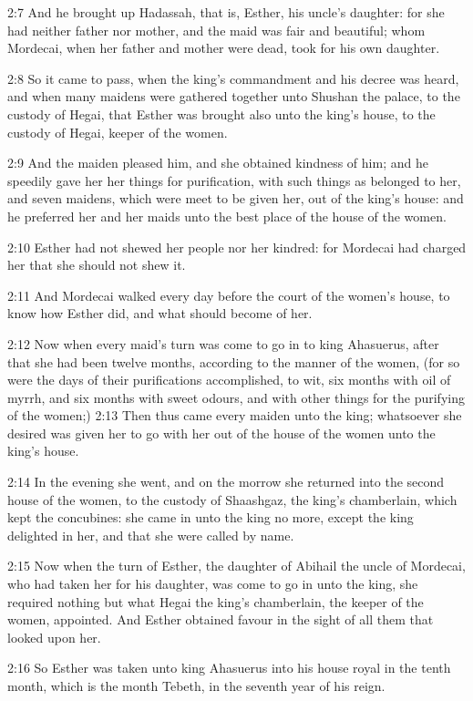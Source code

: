 2:7 And he brought up Hadassah, that is, Esther, his uncle's daughter:
for she had neither father nor mother, and the maid was fair and
beautiful; whom Mordecai, when her father and mother were dead, took
for his own daughter.

2:8 So it came to pass, when the king's commandment and his decree was
heard, and when many maidens were gathered together unto Shushan the
palace, to the custody of Hegai, that Esther was brought also unto the
king's house, to the custody of Hegai, keeper of the women.

2:9 And the maiden pleased him, and she obtained kindness of him; and
he speedily gave her her things for purification, with such things as
belonged to her, and seven maidens, which were meet to be given her,
out of the king's house: and he preferred her and her maids unto the
best place of the house of the women.

2:10 Esther had not shewed her people nor her kindred: for Mordecai
had charged her that she should not shew it.

2:11 And Mordecai walked every day before the court of the women's
house, to know how Esther did, and what should become of her.

2:12 Now when every maid's turn was come to go in to king Ahasuerus,
after that she had been twelve months, according to the manner of the
women, (for so were the days of their purifications accomplished, to
wit, six months with oil of myrrh, and six months with sweet odours,
and with other things for the purifying of the women;) 2:13 Then thus
came every maiden unto the king; whatsoever she desired was given her
to go with her out of the house of the women unto the king's house.

2:14 In the evening she went, and on the morrow she returned into the
second house of the women, to the custody of Shaashgaz, the king's
chamberlain, which kept the concubines: she came in unto the king no
more, except the king delighted in her, and that she were called by
name.

2:15 Now when the turn of Esther, the daughter of Abihail the uncle of
Mordecai, who had taken her for his daughter, was come to go in unto
the king, she required nothing but what Hegai the king's chamberlain,
the keeper of the women, appointed. And Esther obtained favour in the
sight of all them that looked upon her.

2:16 So Esther was taken unto king Ahasuerus into his house royal in
the tenth month, which is the month Tebeth, in the seventh year of his
reign.

